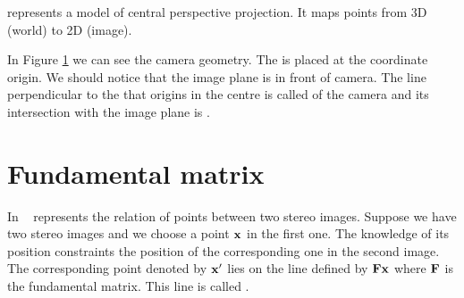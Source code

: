  represents a model of central perspective projection.
It maps points from 3D (world) to 2D (image).

In Figure \ref{fig:camera} we can see the camera geometry.
The  is placed at the coordinate origin.
We should notice that the image plane is in front of camera.
The line perpendicular to the  that origins in the centre is called  of the camera and its intersection with the image plane is .

\begin{figure}[h]
  \label{fig:camera}
  \caption{}
\end{figure}

\section{Fundamental matrix}

In \cv\  represents the relation of points between two stereo images.
Suppose we have two stereo images and we choose a point $\mathbf{x}$ in the first one.
The knowledge of its position constraints the position of the corresponding one in the second image.
The corresponding point denoted by $\mathbf{x'}$ lies on the line defined by $\mathbf{F}\mathbf{x}$ where $\mathbf{F}$ is the fundamental matrix.
This line is called .

